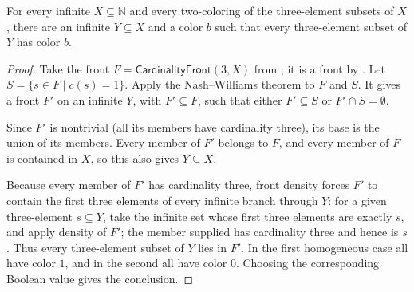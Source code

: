 \begin{lemma}
For every infinite $X\subseteq\mathbb N$ and every two-coloring of the
three-element subsets of $X$, there are an infinite $Y\subseteq X$ and a
color $b$ such that every three-element subset of $Y$ has color $b$.
\end{lemma}
\begin{proof}
Take the front $F=\mathsf{CardinalityFront}(3,X)$ from
; it is a front by
.  Let
$S=\{s\in F\mid c(s)=1\}$.  Apply the Nash--Williams theorem
 to $F$ and $S$.  It gives a front $F'$ on an
infinite $Y$, with $F'\subseteq F$, such that either
$F'\subseteq S$ or $F'\cap S=\emptyset$.

Since $F'$ is nontrivial (all its members have cardinality three), its
base is the union of its members.  Every member of $F'$ belongs to $F$,
and every member of $F$ is contained in $X$, so this also gives
$Y\subseteq X$.

Because every member of $F'$ has cardinality three, front density forces
$F'$ to contain the first three elements of every infinite branch through
$Y$: for a given three-element $s\subseteq Y$, take the infinite set
whose first three elements are exactly $s$, and apply density of $F'$;
the member supplied has cardinality three and hence is $s$.  Thus every
three-element subset of $Y$ lies in $F'$.  In the first homogeneous case
all have color $1$, and in the second all have color $0$.  Choosing the
corresponding Boolean value gives the conclusion.
\end{proof}
